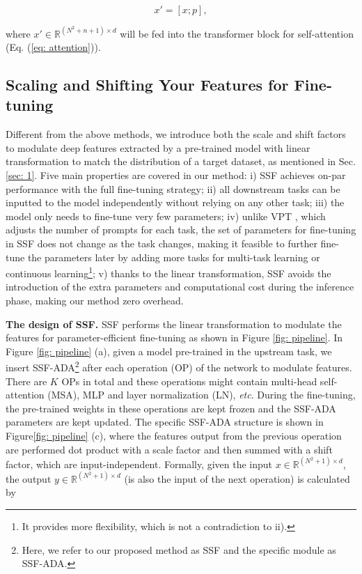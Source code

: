 \begin{equation}\label{eq: vpt}
	x' = [x; p],
\end{equation}

where $x' \in \mathbb{R}^{(N^2 + n + 1) \times d}$ will be fed into the transformer block for self-attention (Eq. (\ref{eq: attention})). 

\subsection{Scaling and Shifting Your Features for Fine-tuning}\label{sec: 3.2}

Different from the above methods, we introduce both the scale and shift factors to modulate deep features extracted by a pre-trained model with linear transformation to match the distribution of a target dataset, as mentioned in Sec. \ref{sec: 1}. Five main properties are covered in our method: i) SSF achieves on-par performance with the full fine-tuning strategy; ii) all downstream tasks can be inputted to the model independently without relying on any other task; iii) the model only needs to fine-tune very few parameters; iv) unlike VPT \cite{jia2022visual}, which adjusts the number of prompts for each task, the set of parameters for fine-tuning in SSF does not change as the task changes, making it feasible to further fine-tune the parameters later by adding more tasks for multi-task learning or continuous learning\footnote{It provides more flexibility, which is not a contradiction to ii).}; v) thanks to the linear transformation, SSF avoids the introduction of the extra parameters and computational cost during the inference phase, making our method zero overhead. 

{\bf The design of SSF.} SSF performs the linear transformation to modulate the features for parameter-efficient fine-tuning as shown in Figure \ref{fig: pipeline}. In Figure \ref{fig: pipeline} (a), given a model pre-trained in the upstream task, we insert SSF-ADA\footnote{Here, we refer to our proposed method as SSF and the specific module as SSF-ADA.} after each operation (OP) of the network to modulate features. There are $K$ OPs in total and these operations might contain multi-head self-attention (MSA), MLP and layer normalization (LN), \emph{etc}. During the fine-tuning, the pre-trained weights in these operations are kept frozen and the SSF-ADA parameters are kept updated. The specific SSF-ADA structure is shown in Figure\ref{fig: pipeline} (c), where the features output from the previous operation are performed dot product with a scale factor and then summed with a shift factor, which are input-independent. Formally, given the input $x \in \mathbb{R}^{(N^2 + 1) \times d}$, the output $y \in \mathbb{R}^{(N^2 + 1) \times d}$ (is also the input of the next operation) is calculated by

